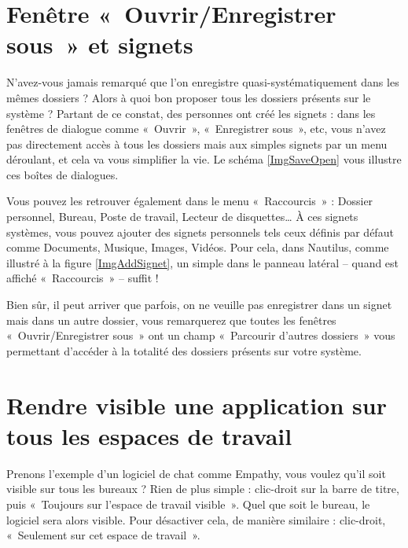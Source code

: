 \section{Fenêtre «~Ouvrir/Enregistrer sous~» et signets}
\label{RefSignets}
N'avez-vous jamais remarqué que l'on enregistre quasi-systématiquement dans les mêmes dossiers ? Alors à quoi bon proposer tous les dossiers présents sur le système ? Partant de ce constat, des personnes ont créé les signets : dans les fenêtres de dialogue comme «~Ouvrir~», «~Enregistrer sous~», etc, vous n'avez pas directement accès à tous les dossiers mais aux simples signets par un menu déroulant, et cela va vous simplifier la vie. Le schéma \ref{ImgSaveOpen} vous illustre ces boîtes de dialogues.\par
{}
Vous pouvez les retrouver également dans le menu «~Raccourcis~» : Dossier personnel, Bureau, Poste de travail, Lecteur de disquettes\ldots{} À ces signets systèmes, vous pouvez ajouter des signets personnels tels ceux définis par défaut comme Documents, Musique, Images, Vidéos. Pour cela, dans Nautilus, comme illustré à la figure \ref{ImgAddSignet}, un simple  dans le panneau latéral -- quand est affiché «~Raccourcis~» -- suffit !\par
{}
Bien sûr, il peut arriver que parfois, on ne veuille pas enregistrer dans un signet mais dans un autre dossier, vous remarquerez que toutes les fenêtres «~Ouvrir/Enregistrer sous~» ont un champ «~Parcourir d'autres dossiers~» vous permettant d'accéder à la totalité des dossiers présents sur votre système.
\section{Rendre visible une application sur tous les espaces de travail}
Prenons l'exemple d'un logiciel de chat comme Empathy, vous voulez qu'il soit visible sur tous les bureaux ? Rien de plus simple : clic-droit sur la barre de titre, puis «~Toujours sur l'espace de travail visible~». Quel que soit le bureau, le logiciel sera alors visible. Pour désactiver cela, de manière similaire : clic-droit, «~Seulement sur cet espace de travail~».
